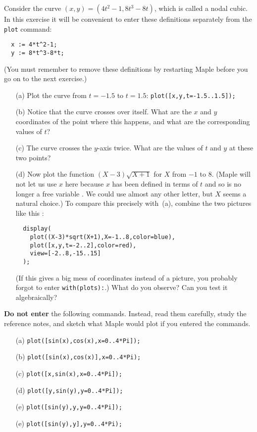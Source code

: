 \documentclass[a4paper,10pt]{amsbook}
\numberwithin{example}{chapter}
\begin{document}
\begin{exercise}\label{ex-nodal}
 Consider the curve $(x,y)=(4t^2-1,8t^3-8t)$, which is called a nodal
 cubic.  In this exercise it will be convenient to enter these
 definitions separately from the \verb~plot~ command:
\begin{verbatim}
  x := 4*t^2-1;
  y := 8*t^3-8*t;
\end{verbatim}
 (You must remember to remove these definitions by restarting Maple
 \note{\NOTErestart} before you go on to the next exercise.) 
 \begin{itemize}
  \item[(a)] Plot the curve from $t=-1.5$ to $t=1.5$:
   \verb~plot([x,y,t=-1.5..1.5]);~  
  \item[(b)] Notice that the curve crosses over itself.  What are the
   $x$ and $y$ coordinates of the point where this happens, and what
   are the corresponding values of $t$? 
  \item[(c)] The curve crosses the $y$-axis twice.  What are the
   values of $t$ and $y$ at these two points? 
  \item[(d)] Now plot the function $(X-3)\sqrt{X+1}$ for $X$ from $-1$
   to $8$.  (Maple will not let us use $x$ here because
   $x$ has been defined in terms of $t$ and so is no longer a free
   variable \note{\NOTEbadplotvar}.  We could use almost any
   other letter, but $X$ seems a  natural choice.)  To
   compare this precisely with~(a), combine the two pictures
   like this \note{\NOTEdisplay,\NOTEparametricrange}: 
\begin{verbatim}
  display(
    plot((X-3)*sqrt(X+1),X=-1..8,color=blue),
    plot([x,y,t=-2..2],color=red),
    view=[-2..8,-15..15]     
  );
\end{verbatim}
   (If this gives a big mess of coordinates instead of a picture, you
   probably forgot to enter \verb~with(plots):~.) 
   What do you observe?  Can you test it algebraically? 
 \end{itemize}
\end{exercise}

\begin{exercise}
 \textbf{Do not enter} the following commands.  Instead, read them
 carefully, study the reference notes, and sketch what Maple would
 plot if you entered the commands.
 \begin{itemize}
  \item[(a)] \verb~plot([sin(x),cos(x),x=0..4*Pi]);~
  \item[(b)] \verb~plot([sin(x),cos(x)],x=0..4*Pi);~
  \item[(c)] \verb~plot([x,sin(x),x=0..4*Pi]);~
  \item[(d)] \verb~plot([y,sin(y),y=0..4*Pi]);~
  \item[(e)] \verb~plot([sin(y),y,y=0..4*Pi]);~
  \item[(e)] \verb~plot([sin(y),y],y=0..4*Pi);~
 \end{itemize}
\end{exercise}
\end{document}
